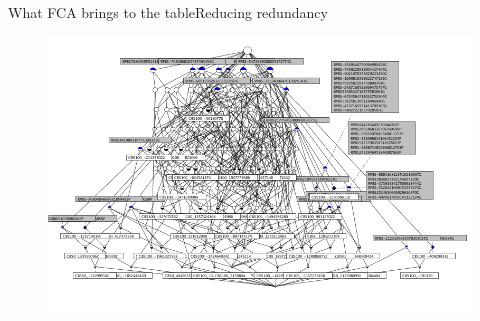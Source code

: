 \begin{frame}{What FCA brings to the table}{Reducing redundancy}
  \begin{figure}[ht]
    \begin{minipage}[t]{0.8\linewidth}
      \vspace{0pt}
      \centering
      \includegraphics[width=\textwidth]{img/fca/lattice1}
    \end{minipage}
    \hfill
    \begin{minipage}[t]{0\linewidth}
    \end{minipage}
  \end{figure}
\end{frame}


%

